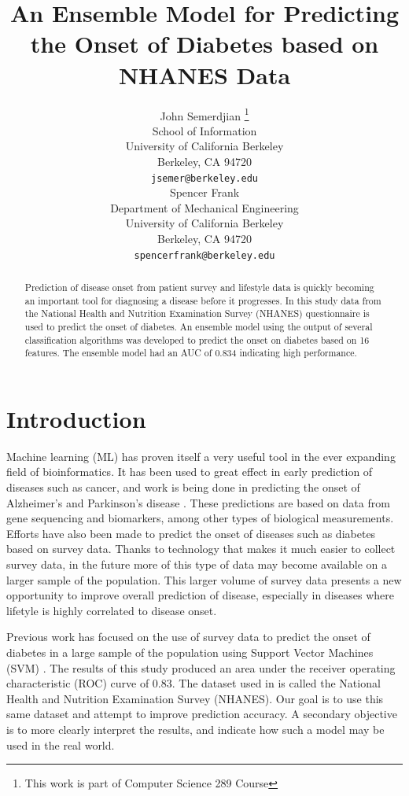 \documentclass{article} %
\title{An Ensemble Model for Predicting the Onset of Diabetes based on NHANES Data}
\author{ John Semerdjian \thanks{This work is part of Computer Science 289 Course} \\
School of Information \\
University of California Berkeley\\
Berkeley, CA 94720 \\
\texttt{jsemer@berkeley.edu} \\
\And
Spencer Frank \\
Department of Mechanical Engineering\\
University of California Berkeley\\
Berkeley, CA 94720 \\
\texttt{spencerfrank@berkeley.edu} \\
}
\begin{document}
\maketitle

\begin{abstract}
Prediction of disease onset from patient survey and lifestyle data is quickly becoming an important tool for diagnosing a disease before it progresses. In this study data from the National Health and Nutrition Examination Survey (NHANES) questionnaire is used to predict the onset of diabetes. An ensemble model using the output of several classification algorithms was developed to predict the onset on diabetes based on 16 features. The ensemble model had an AUC of 0.834 indicating high performance. 

\end{abstract}

\section{Introduction}
Machine learning (ML) has proven itself a very useful tool in the ever expanding field of bioinformatics. It has been used to great effect in early prediction of diseases such as cancer\cite{capriotti_predicting_2006}, and work is being done in predicting the onset of Alzheimer's and Parkinson's disease \cite{capriotti_predicting_2006}. These predictions are based on data from gene sequencing and biomarkers, among other types of biological measurements. Efforts have also been made to predict the onset of diseases such as diabetes based on survey data. Thanks to technology that makes it much easier to collect survey data, in the future more of this type of data may become available on a larger sample of the population. This larger volume of survey data presents a new opportunity to improve overall prediction of disease, especially in diseases where lifetyle is  highly correlated to disease onset\cite{_reduction_2002}.

Previous work has focused on the use of survey data to predict the onset of diabetes in a large sample of the population using Support Vector Machines (SVM) \cite{yu_application_2010}. The results of this study produced an area under the receiver operating characteristic (ROC) curve of 0.83. The dataset used in \cite{yu_application_2010} is called the National Health and Nutrition Examination Survey (NHANES). Our goal is to use this same dataset and attempt to improve prediction accuracy. A secondary objective is to more clearly interpret the results, and indicate how such a model may be used in the real world.
\end{document}
